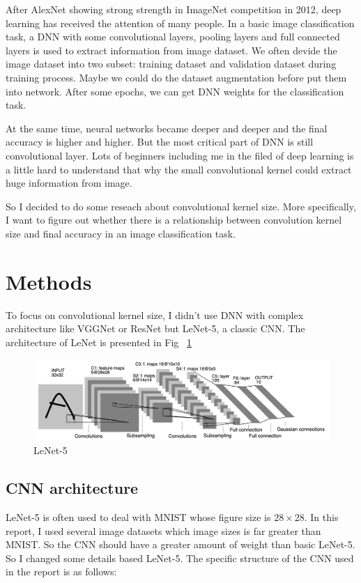 \documentclass[a4paper,10pt]{article}
\begin{document}
\paragragh After AlexNet\cite{NIPS2012_4824} showing strong strength in ImageNet competition in 2012, deep learning
has received the attention of many people. In a basic image classification task, a DNN with some 
convolutional layers, pooling layers and full connected layers is used to extract information from 
image dataset. We often devide the image dataset into two subset: training dataset and validation 
dataset during training process. Maybe we could do the dataset augmentation before put them into 
network. After some epochs, we can get DNN weights for the classification task.


At the same time, neural networks became deeper and deeper and the final accuracy is
 higher and higher. But the most critical part of DNN is still convolutional layer.
Lots of beginners including me in the filed of deep learning is a little hard to 
understand that why the small convolutional kernel could extract huge information from 
image. 
 

So I decided to do some reseach about convolutional kernel size. More specifically,
I want to figure out whether there is a relationship between convolution kernel size and 
final accuracy in an image classification task. 
 
 
\section{Methods}
To focus on convolutional kernel size, I didn't use DNN with complex architecture like VGGNet\cite{simonyan2014very} or 
ResNet\cite{he2016deep} but LeNet-5\cite{lecun1998gradient}, a classic CNN. The architecture of LeNet is presented in Fig ~\ref{Fig.LeNet-5}

\begin{figure}[htpb]
\centering 
\includegraphics[width=1\textwidth]{report_image/LeNet5.png} 
\caption{LeNet-5} 
\label{Fig.LeNet-5} 
\end{figure}

\subsection{CNN architecture}
LeNet-5 is often used to deal with MNIST whose figure size is $28\times28$. In this report, I used 
several image datasets which image sizes is far greater than MNIST. So the CNN should have a greater
amount of weight than basic LeNet-5. So I changed some details based LeNet-5. The specific structure
of the CNN used in the report is as follows:
\end{document}
